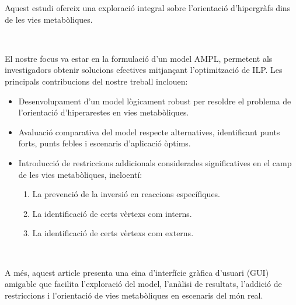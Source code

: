 Aquest estudi ofereix una exploració integral sobre l'orientació d'hipergràfs dins de les vies metabòliques.

~

El nostre focus va estar en la formulació d'un model AMPL, permetent als investigadors obtenir solucions efectives mitjançant l'optimització de ILP. Les principals contribucions del nostre treball inclouen:

\begin{itemize}
\item Desenvolupament d'un model lògicament robust per resoldre el problema de l'orientació d'hiperarestes en vies metabòliques.
\item Avaluació comparativa del model respecte alternatives, identificant punts forts, punts febles i escenaris d'aplicació òptims.
\item Introducció de restriccions addicionals considerades significatives en el camp de les vies metabòliques, incloentí:
\begin{enumerate}[left=2em]
\item La prevenció de la inversió en reaccions específiques.
\item La identificació de certs vèrtexs com interns.
\item La identificació de certs vèrtexs com externs.
\end{enumerate}
\end{itemize}

~

A més, aquest article presenta una eina d'interfície gràfica d'usuari (GUI) amigable que facilita l'exploració del model, l'anàlisi de resultats, l'addició de restriccions i l'orientació de vies metabòliques en escenaris del món real.
